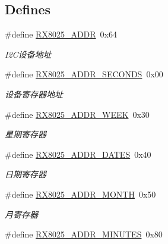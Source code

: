 \subsection*{\-Defines}
\begin{DoxyCompactItemize}
\item 
\hypertarget{group___r_t_c_gafd32b987540dc4ff9a42b0f38f5714e2}{\#define \hyperlink{group___r_t_c_gafd32b987540dc4ff9a42b0f38f5714e2}{\-R\-X8025\-\_\-\-A\-D\-D\-R}~0x64}\label{group___r_t_c_gafd32b987540dc4ff9a42b0f38f5714e2}

\begin{DoxyCompactList}\small\item\em \-I2\-C设备地址 \end{DoxyCompactList}\item 
\#define \hyperlink{group___r_t_c_ga8c3426877a1caf234a667f0c0e58fd2e}{\-R\-X8025\-\_\-\-A\-D\-D\-R\-\_\-\-S\-E\-C\-O\-N\-D\-S}~0x00
\begin{DoxyCompactList}\small\item\em 设备寄存器地址 \end{DoxyCompactList}\item 
\hypertarget{group___r_t_c_ga3ee94c0bc1a53d58526f48b41ed44d2f}{\#define \hyperlink{group___r_t_c_ga3ee94c0bc1a53d58526f48b41ed44d2f}{\-R\-X8025\-\_\-\-A\-D\-D\-R\-\_\-\-W\-E\-E\-K}~0x30}\label{group___r_t_c_ga3ee94c0bc1a53d58526f48b41ed44d2f}

\begin{DoxyCompactList}\small\item\em 星期寄存器 \end{DoxyCompactList}\item 
\hypertarget{group___r_t_c_ga0f805e684493aa7d586ff1fac6b794e6}{\#define \hyperlink{group___r_t_c_ga0f805e684493aa7d586ff1fac6b794e6}{\-R\-X8025\-\_\-\-A\-D\-D\-R\-\_\-\-D\-A\-T\-E\-S}~0x40}\label{group___r_t_c_ga0f805e684493aa7d586ff1fac6b794e6}

\begin{DoxyCompactList}\small\item\em 日期寄存器 \end{DoxyCompactList}\item 
\hypertarget{group___r_t_c_ga561666ebab18081a04d0a64fd9d1805d}{\#define \hyperlink{group___r_t_c_ga561666ebab18081a04d0a64fd9d1805d}{\-R\-X8025\-\_\-\-A\-D\-D\-R\-\_\-\-M\-O\-N\-T\-H}~0x50}\label{group___r_t_c_ga561666ebab18081a04d0a64fd9d1805d}

\begin{DoxyCompactList}\small\item\em 月寄存器 \end{DoxyCompactList}\item 
\hypertarget{group___r_t_c_ga303d3794c823d33caf68cc580c6344a9}{\#define \hyperlink{group___r_t_c_ga303d3794c823d33caf68cc580c6344a9}{\-R\-X8025\-\_\-\-A\-D\-D\-R\-\_\-\-M\-I\-N\-U\-T\-E\-S}~0x80}\label{group___r_t_c_ga303d3794c823d33caf68cc580c6344a9}


\end{DoxyCompactItemize}
